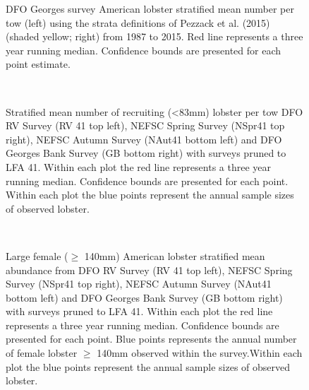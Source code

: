 \documentclass[11pt]{article}
\newcommand{\e}{/backup/bio_data/bio.lobster/figures/} %
\begin{document}
\begin{landscape}
\begin{figure}
\centering
    
    \caption{DFO Georges survey American lobster stratified mean number per tow (left) using the strata definitions of Pezzack et al. (2015) (shaded yellow; right) from 1987 to 2015. Red line represents a three year running median. Confidence bounds are presented for each point estimate.}

\end{figure}
\end{landscape}
\clearpage

\begin{figure}
\centering
{}\\

\caption{Stratified mean number of recruiting (\textless 83mm) lobster per tow DFO RV Survey (RV 41 top left), NEFSC Spring Survey (NSpr41 top right), NEFSC Autumn Survey (NAut41 bottom left) and DFO Georges Bank Survey (GB bottom right) with surveys pruned to LFA 41. Within each plot the red line represents a three year running median. Confidence bounds are presented for each point. Within each plot the blue points represent the annual sample sizes of observed lobster.}
\end{figure}
\clearpage



\begin{figure}
\centering
{}\\

\caption{Large female ($\geq$ 140mm) American lobster stratified mean abundance from DFO RV Survey (RV 41 top left), NEFSC Spring Survey (NSpr41 top right), NEFSC Autumn Survey (NAut41 bottom left) and DFO Georges Bank Survey (GB bottom right) with surveys pruned to LFA 41. Within each plot the red line represents a three year running median. Confidence bounds are presented for each point.  Blue points represents the annual number of female lobster $\geq$ 140mm observed within the survey.Within each plot the blue points represent the annual sample sizes of observed lobster.}
\end{figure}
\clearpage
\end{document}
